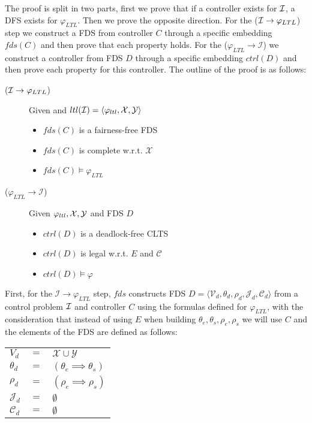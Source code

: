 The proof is split in two parts, first we prove that if a controller exists for ${\mathcal{I}}$, a DFS exists for $\varphi_{LTL}$. Then we prove the opposite direction. For the (${\mathcal{I}} \rightarrow \varphi_{LTL}$) step we construct a FDS from controller $C$ through a specific embedding $fds(C)$ and then prove that each property holds. For the ($\varphi_{LTL} \rightarrow \mathcal{I}$) we construct a controller from FDS $D$ through a specific embedding $ctrl(D)$ and then prove each property for this controller. The outline of the proof is as follows:

\begin{description}
	\item[(${\mathcal{I}} \rightarrow \varphi_{LTL}$)] Given \controlProblemDef and $ltl({\mathcal{I}}) = \langle \varphi_{ltl}, {\mathcal{X}}, {\mathcal{Y}}\rangle$
		\begin{itemize}
			\item $fds(C)$ is a fairness-free FDS			
			\item $fds(C)$ is complete w.r.t. $\mathcal{X}$
			\item $fds(C) \models \varphi_{LTL}$
		\end{itemize}
	\item[($\varphi_{LTL} \rightarrow \mathcal{I}$)] Given $\varphi_{ltl}, {\mathcal{X}}, {\mathcal{Y}}$ and FDS $D$
		\begin{itemize}
			\item $ctrl(D)$ is a deadlock-free CLTS			
			\item $ctrl(D)$ is legal w.r.t. $E$ and $\mathcal{C}$
			\item $ctrl(D) \models \varphi$
		\end{itemize}	
\end{description}

First,  for the $\mathcal{I} \rightarrow \varphi_{LTL}$ step, $fds$ constructs FDS $D=\langle \mathcal V_d, \theta_d, \rho_d, \mathcal{J}_d, \mathcal{C}_d \rangle$ from a control problem ${\mathcal{I}}$ and controller $C$ using the formulas defined for $\varphi_{LTL}$, with the consideration that instead of using $E$ when building $\theta_e,\theta_s,\rho_e,\rho_s$ we will use $C$ and the elements of the FDS are defined as follows:

	\begin{tabular}{ l c l }
	$V_d$ & $=$ & $\mathcal{X} \cup \mathcal{Y}$\\	
	$\theta_d$ & $=$ & $(\theta_e \implies \theta_s)$\\
	$\rho_d$ & $=$ & $(\rho_e \implies \rho_s)$\\	
	$\mathcal{J}_d$ & $=$ & $\emptyset$\\
	$\mathcal{C}_d$ & $=$ & $\emptyset$\\
\end{tabular}

